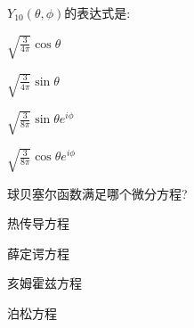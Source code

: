 \documentclass{njustexam}
\begin{document}
\begin{problem}
  $Y_{10}(\theta,  \phi)$的表达式是:
\begin{abcd}
  \item $\sqrt{\frac{3}{4\pi}} \cos \theta$
  \item $\sqrt{\frac{3}{4\pi}} \sin \theta$
  \item $\sqrt{\frac{3}{8\pi}} \sin \theta e^{i\phi}$
  \item $\sqrt{\frac{3}{8\pi}} \cos \theta e^{i\phi}$
\end{abcd}
\end{problem}









\begin{problem}
  球贝塞尔函数满足哪个微分方程? 

  \begin{abcd}
    \item 热传导方程
    \item 薛定谔方程
    \item 亥姆霍兹方程
    \item 泊松方程
  \end{abcd}
\end{problem}
\end{document}
